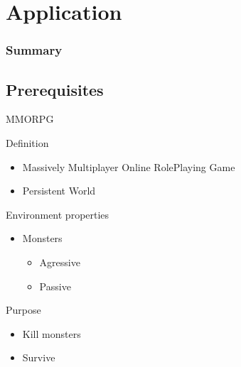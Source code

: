 \section{Application}

\begin{frame}
  \frametitle{Summary}
  \tableofcontents[currentsection]
\end{frame}

\subsection{Prerequisites}

\begin{frame}{MMORPG}
  \begin{block}{Definition}
    \begin{itemize}
    \item Massively Multiplayer Online RolePlaying Game
    \item Persistent World
    \end{itemize}
  \end{block}

  \begin{block}{Environment properties}
    \begin{itemize}
    \item Monsters
      \begin{itemize}
      \item Agressive
      \item Passive
      \end{itemize}
    \end{itemize}
  \end{block}

  \begin{block}{Purpose}
    \begin{itemize}
    \item Kill monsters
    \item Survive
    \end{itemize}
  \end{block}
\end{frame}

